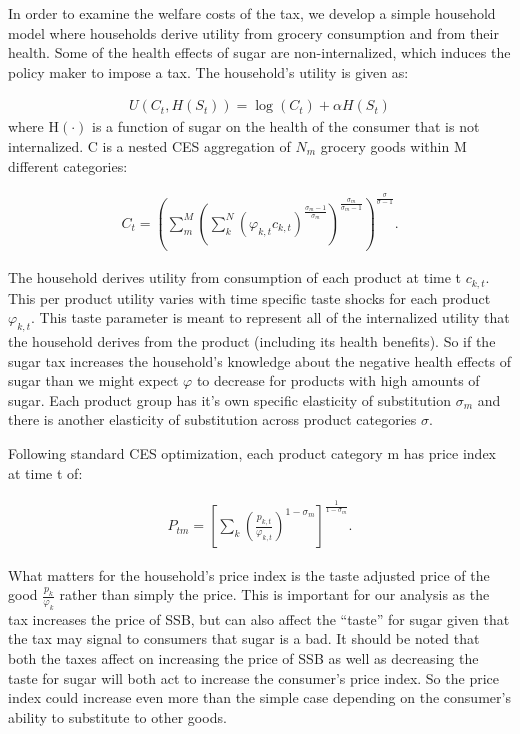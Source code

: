 \documentclass[12pt]{article}
\begin{document}
In order to examine the welfare costs of the tax, we develop a simple household model where households derive utility from grocery consumption and from their health. Some of the health effects of sugar are non-internalized, which induces the policy maker to impose a tax. The household's utility is given as:

\begin{align}
	U(C_t,H(S_t)) = \log(C_t) + \alpha H(S_t) 
\end{align}
where H$(\cdot)$ is a function of sugar on the health of the consumer that is not internalized. C is a nested CES aggregation of $N_m$ grocery goods within M different categories:

\begin{align}
	C_t = \left( \sum_m^M \left( \sum_k^N (\varphi_{k,t} c_{k,t})^{\frac{\sigma_m-1}{\sigma_m}}  \right)^{\frac{\sigma_m}{\sigma_m-1}} \right)^{\frac{\sigma}{\sigma-1}}.
\end{align}

The household derives utility from consumption of each product at time t $c_{k,t}$. This per product utility varies with time specific taste shocks for each product $\varphi_{k,t}$. This taste parameter is meant to represent all of the internalized utility that the household derives from the product (including its health benefits). So if the sugar tax increases the household's knowledge about the negative health effects of sugar than we might expect $\varphi$ to decrease for products with high amounts of sugar. Each product group has it's own specific elasticity of substitution $\sigma_m$ and there is another elasticity of substitution across product categories $\sigma$. 

Following standard CES optimization, each product category m has price index at time t of:

\begin{align}
    P_{tm} = \left[ \sum_k \left( \frac{p_{k,t}}{\varphi_{k,t}}  \right)^{1-\sigma_m}  \right]^{\frac{1}{1-\sigma_m}}. \label{priceindex_simple}
\end{align}

What matters for the household's price index is the taste adjusted price of the good $\frac{p_k}{\varphi_k}$ rather than simply the price. This is important for our analysis as the tax increases the price of SSB, but can also affect the ``taste'' for sugar given that the tax may signal to consumers that sugar is a bad. It should be noted that both the taxes affect on increasing the price of SSB as well as decreasing the taste for sugar will both act to increase the consumer's price index. So the price index could increase even more than the simple case depending on the consumer's ability to substitute to other goods. 
\end{document}
